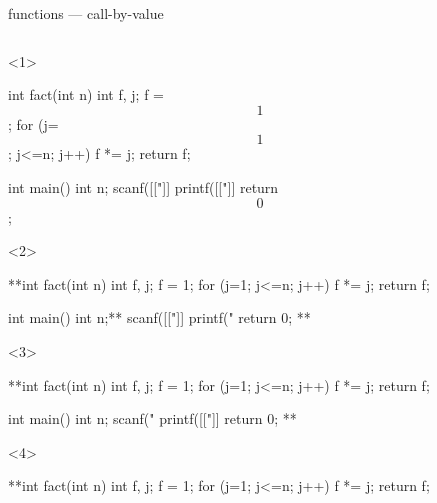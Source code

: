 \documentclass[10pt,t,svgnames]{beamer}
\begin{document}
  \begin{frame}[fragile]{functions --- call-by-value}
    \begin{columns}
      \begin{column}{.6\textwidth}
        \vspace{-15em} %
        \begin{scriptsize}
          \begin{onlyenv}<1>
            \begin{codeblock}[firstnumber=5, gobble=8]
              int fact(int n) {
                int f, j;
                f = $$1$$;
                for (j=$$1$$; j<=n; j++) {
                  f *= j;
                }
                return f;
              }

              int main() {
                int n;
                scanf([["]]%
                printf([["]]%
                return $$0$$;
              }
            \end{codeblock}
          \end{onlyenv}
          \begin{onlyenv}<2>
            \begin{codeblock}[firstnumber=5, gobble=8]
              **int fact(int n) {
                int f, j;
                f = 1;
                for (j=1; j<=n; j++) {
                  f *= j;
                }
                return f;
              }

              int main() {
                int n;**
                scanf([["]]%
                printf("%
                return 0;
              }**
            \end{codeblock}
          \end{onlyenv}
          \begin{onlyenv}<3>
            \begin{codeblock}[firstnumber=5, gobble=8]
              **int fact(int n) {
                int f, j;
                f = 1;
                for (j=1; j<=n; j++) {
                  f *= j;
                }
                return f;
              }

              int main() {
                int n;
                scanf("%
                printf([["]]%
                return 0;
              }**
            \end{codeblock}
          \end{onlyenv}
          \begin{onlyenv}<4>
            \begin{codeblock}[firstnumber=5, gobble=8]
              **int fact(int n) {
                int f, j;
                f = 1;
                for (j=1; j<=n; j++) {
                  f *= j;
                }
                return f;
              }


\end{codeblock}
\end{onlyenv}
\end{scriptsize}
\end{column}
\end{columns}
\end{frame}
\end{document}
